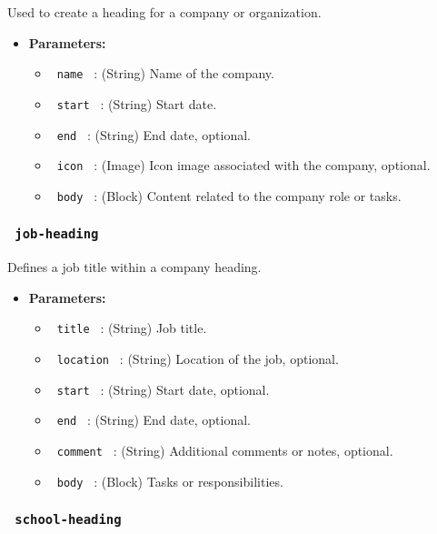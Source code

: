 Used to create a heading for a company or organization.

\begin{itemize}
\tightlist
\item
  \textbf{Parameters:}

  \begin{itemize}
  \tightlist
  \item
    \texttt{\ name\ } : (String) Name of the company.
  \item
    \texttt{\ start\ } : (String) Start date.
  \item
    \texttt{\ end\ } : (String) End date, optional.
  \item
    \texttt{\ icon\ } : (Image) Icon image associated with the company,
    optional.
  \item
    \texttt{\ body\ } : (Block) Content related to the company role or
    tasks.
  \end{itemize}
\end{itemize}

\subsubsection{\texorpdfstring{\texttt{\ job-heading\ }}{ job-heading }}\label{job-heading}

Defines a job title within a company heading.

\begin{itemize}
\tightlist
\item
  \textbf{Parameters:}

  \begin{itemize}
  \tightlist
  \item
    \texttt{\ title\ } : (String) Job title.
  \item
    \texttt{\ location\ } : (String) Location of the job, optional.
  \item
    \texttt{\ start\ } : (String) Start date, optional.
  \item
    \texttt{\ end\ } : (String) End date, optional.
  \item
    \texttt{\ comment\ } : (String) Additional comments or notes,
    optional.
  \item
    \texttt{\ body\ } : (Block) Tasks or responsibilities.
  \end{itemize}
\end{itemize}

\subsubsection{\texorpdfstring{\texttt{\ school-heading\ }}{ school-heading }}\label{school-heading}

